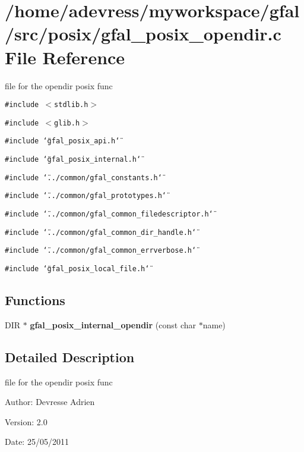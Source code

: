 \section{/home/adevress/myworkspace/gfal/src/posix/gfal\_\-posix\_\-opendir.c File Reference}
\label{gfal__posix__opendir_8c}
file for the opendir posix func 

{\tt \#include $<$stdlib.h$>$}\par
{\tt \#include $<$glib.h$>$}\par
{\tt \#include \char`\"{}gfal\_\-posix\_\-api.h\char`\"{}}\par
{\tt \#include \char`\"{}gfal\_\-posix\_\-internal.h\char`\"{}}\par
{\tt \#include \char`\"{}../common/gfal\_\-constants.h\char`\"{}}\par
{\tt \#include \char`\"{}../common/gfal\_\-prototypes.h\char`\"{}}\par
{\tt \#include \char`\"{}../common/gfal\_\-common\_\-filedescriptor.h\char`\"{}}\par
{\tt \#include \char`\"{}../common/gfal\_\-common\_\-dir\_\-handle.h\char`\"{}}\par
{\tt \#include \char`\"{}../common/gfal\_\-common\_\-errverbose.h\char`\"{}}\par
{\tt \#include \char`\"{}gfal\_\-posix\_\-local\_\-file.h\char`\"{}}\par
\subsection*{Functions}
\begin{CompactItemize}
\item 
DIR $\ast$ \textbf{gfal\_\-posix\_\-internal\_\-opendir} (const char $\ast$name)\label{gfal__posix__opendir_8c_b2e2608cd7c4ff0cecf68e04923d93cc}

\end{CompactItemize}


\subsection{Detailed Description}
file for the opendir posix func 

\begin{Desc}
\item[Author:]Devresse Adrien \end{Desc}
\begin{Desc}
\item[Version:]2.0 \end{Desc}
\begin{Desc}
\item[Date:]25/05/2011 \end{Desc}
